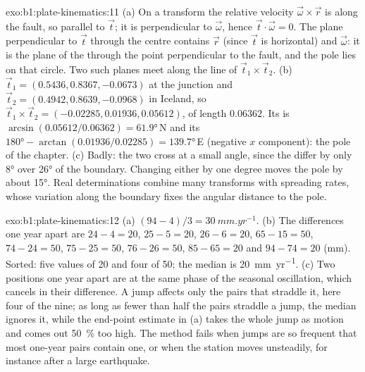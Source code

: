 \begin{solution}{exo:b1:plate-kinematics:11}
(a) On a transform the relative velocity $\vec\omega\times\vec r$ is along the
fault, so parallel to $\vec t$; it is perpendicular to $\vec\omega$, hence
$\vec t\cdot\vec\omega = 0$. The plane perpendicular to $\vec t$ through the
centre contains $\vec r$ (since $\vec t$ is horizontal) and $\vec\omega$: it
is the plane of the  through the point perpendicular to the fault,
and the pole lies on that circle. Two such planes meet along the line of
$\vec t_1\times\vec t_2$. (b) $\vec t_1 = (0.5436, 0.8367, -0.0673)$ at the
junction and $\vec t_2 = (0.4942, 0.8639, -0.0968)$ in Iceland, so
$\vec t_1\times\vec t_2 = (-0.02285, 0.01936, 0.05612)$, of length $0.06362$.
Its  is $\arcsin(0.05612/0.06362) = \ang{61.9}$\,N and its 
$\ang{180} - \arctan(0.01936/0.02285) = \ang{139.7}$\,E (negative $x$ component):
the pole of the chapter. (c) Badly: the two  cross at a small
angle, since the  differ by only \ang{8} over \ang{26} of the boundary.
Changing either  by one degree moves the pole by about \ang{15}. Real
determinations combine many transforms with spreading rates, whose variation
along the boundary fixes the angular distance to the pole.
\end{solution}

\begin{solution}{exo:b1:plate-kinematics:12}
(a) $(94 - 4)/3 = \qty{30}{mm.yr^{-1}}$. (b) The differences one year apart are
$24 - 4 = 20$, $25 - 5 = 20$, $26 - 6 = 20$, $65 - 15 = 50$, $74 - 24 = 50$,
$75 - 25 = 50$, $76 - 26 = 50$, $85 - 65 = 20$ and $94 - 74 = 20$ (mm). Sorted:
five values of 20 and four of 50; the median is \qty{20}{mm.yr^{-1}}. (c) Two
positions one year apart are at the same phase of the seasonal oscillation,
which cancels in their difference. A jump affects only the pairs that straddle
it, here four of the nine; as long as fewer than half the pairs straddle a jump,
the median ignores it, while the end-point estimate in (a) takes the whole jump
as motion and comes out \qty{50}{\percent} too high. The method fails when
jumps are so frequent that most one-year pairs contain one, or when the station
moves unsteadily, for instance after a large earthquake.
\end{solution}


